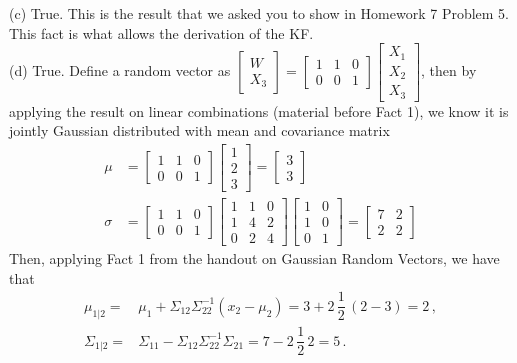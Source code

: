 \documentclass[letterpaper]{article}
\begin{document}
(c) True. This is the result that we asked you to show in Homework 7 Problem 5. This fact is what allows the derivation of the KF.\\

(d) True. Define a random vector as $\begin{bmatrix} W \\ X_{3}\end{bmatrix}=\begin{bmatrix} 1& 1 & 0\\  0& 0&1\end{bmatrix} \begin{bmatrix}X_1 \\
X_{2}\\ X_{3}\end{bmatrix}$, then by applying the result on linear combinations (material before Fact 1), we know it is jointly Gaussian distributed with mean and covariance matrix
\begin{align*}
  \mu & = \begin{bmatrix} 1& 1 & 0\\  0& 0&1\end{bmatrix}\begin{bmatrix} 1\\  2\\3\end{bmatrix}=\begin{bmatrix} 3\\3\end{bmatrix}\\
  \sigma & =\begin{bmatrix} 1& 1 & 0\\  0& 0&1\end{bmatrix}\begin{bmatrix} 1 & 1&0\\ 1&4&2\\ 0&2&4\end{bmatrix}\begin{bmatrix}  1 & 0\\  1& 0\\ 0 &1\end{bmatrix}
    =\begin{bmatrix}  7 & 2\\  2 &2\end{bmatrix}
\end{align*}
Then, applying Fact 1 from the handout on Gaussian Random Vectors, we have that
\begin{align*}
\mu_{1|2}=& \mu_1 + \Sigma_{12} \Sigma_{22}^{-1} (x_2 - \mu_2) = 3+2\,\dfrac{1}{2}\, (2-3) =2\,,\\
 \Sigma_{1|2}= &\Sigma_{11}-\Sigma_{12} \Sigma_{22}^{-1}\Sigma_{21} = 7-2\,\dfrac{1}{2}\,2=5\,.
\end{align*}
\end{document}
